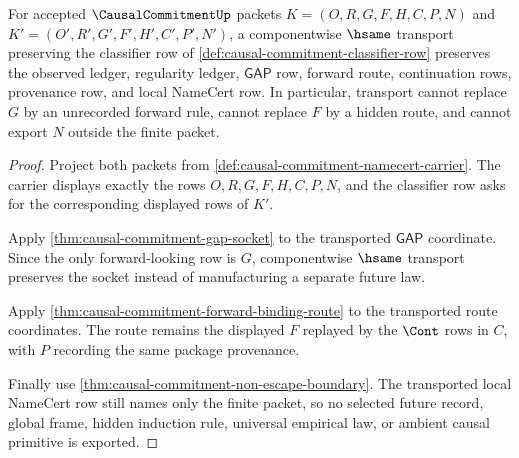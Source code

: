 \begin{theorem}
\label{thm:causal-commitment-carrier-transport}
For accepted $\CausalCommitmentUp$ packets $K=(O,R,G,F,H,C,P,N)$ and $K'=(O',R',G',F',H',C',P',N')$, a componentwise $\hsame$ transport preserving the classifier row of \autoref{def:causal-commitment-classifier-row} preserves the observed ledger, regularity ledger, $\mathsf{GAP}$ row, forward route, continuation rows, provenance row, and local NameCert row. In particular, transport cannot replace $G$ by an unrecorded forward rule, cannot replace $F$ by a hidden route, and cannot export $N$ outside the finite packet.
\end{theorem}
\begin{proof}
Project both packets from \autoref{def:causal-commitment-namecert-carrier}. The carrier displays exactly the rows $O,R,G,F,H,C,P,N$, and the classifier row asks for the corresponding displayed rows of $K'$.

Apply \autoref{thm:causal-commitment-gap-socket} to the transported $\mathsf{GAP}$ coordinate. Since the only forward-looking row is $G$, componentwise $\hsame$ transport preserves the socket instead of manufacturing a separate future law.

Apply \autoref{thm:causal-commitment-forward-binding-route} to the transported route coordinates. The route remains the displayed $F$ replayed by the $\Cont$ rows in $C$, with $P$ recording the same package provenance.

Finally use \autoref{thm:causal-commitment-non-escape-boundary}. The transported local NameCert row still names only the finite packet, so no selected future record, global frame, hidden induction rule, universal empirical law, or ambient causal primitive is exported.
\end{proof}

